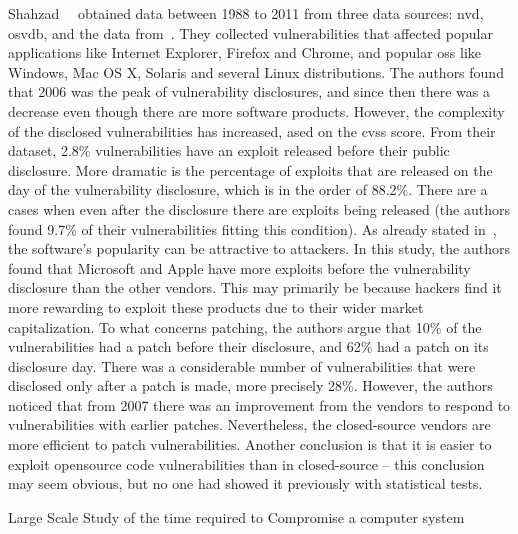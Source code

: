 Shahzad~\etal{}~\cite{Shahzad:2012} obtained data between 1988 to 2011 from three data sources: \gls{nvd}, \gls{osvdb}, and the data from~\cite{Frei:2006}. 
They collected vulnerabilities that affected popular applications like Internet Explorer, Firefox and Chrome, and popular \glspl{os} like Windows, Mac OS X, Solaris and several Linux distributions. 
The authors found that 2006 was the peak of vulnerability disclosures, and since then there was a decrease even though there are more software products. 
However, the complexity of the disclosed vulnerabilities has increased, ased on the \gls{cvss} score. 
From their dataset, 2.8\% vulnerabilities have an exploit released before their public disclosure. 
More dramatic is the percentage of exploits that are released on the day of the vulnerability disclosure, which is in the order of 88.2\%. 
There are a cases when even after the disclosure there are exploits being released (the authors found 9.7\% of their vulnerabilities fitting this condition). 
As already stated in~\cite{Gorbenko:2011}, the software’s popularity can be attractive to attackers. 
In this study, the authors found that Microsoft and Apple have more exploits before the vulnerability disclosure than the other vendors. 
This may primarily be because hackers find it more rewarding to exploit these products due to their wider market capitalization.
To what concerns patching, the authors argue that 10\% of the vulnerabilities had a patch before their disclosure, and 62\% had a patch on its disclosure day. 
There was a considerable number of vulnerabilities that were disclosed only after a patch is made, more precisely 28\%. 
However, the authors noticed that from 2007 there was an improvement from the vendors to respond to vulnerabilities with earlier patches. 
Nevertheless, the closed-source vendors are more efficient to patch vulnerabilities. 
Another conclusion is that it is easier to exploit opensource code vulnerabilities than in closed-source – this conclusion may seem obvious, but no one had showed it previously with statistical tests.


Large Scale Study of the time required to Compromise a computer system~\cite{Holm:2014}

